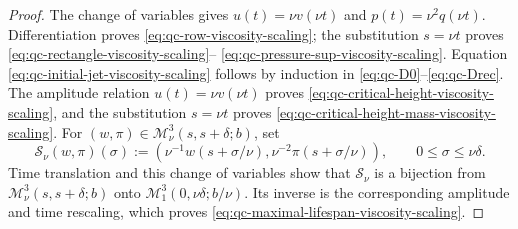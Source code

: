 \begin{proof}
The change of variables gives
\(u(t)=\nu v(\nu t)\) and \(p(t)=\nu^2q(\nu t)\).
Differentiation proves \eqref{eq:qc-row-viscosity-scaling}; the substitution
\(s=\nu t\) proves
\eqref{eq:qc-rectangle-viscosity-scaling}--%
\eqref{eq:qc-pressure-sup-viscosity-scaling}.
Equation \eqref{eq:qc-initial-jet-viscosity-scaling} follows by induction in
\eqref{eq:qc-D0}--\eqref{eq:qc-Drec}.  The amplitude relation
\(u(t)=\nu v(\nu t)\) proves
\eqref{eq:qc-critical-height-viscosity-scaling}, and the substitution
\(s=\nu t\) proves
\eqref{eq:qc-critical-height-mass-viscosity-scaling}.  For
\((w,\pi)\in\mathscr M_\nu^3(s,s+\delta;b)\), set
\[
 \mathcal S_\nu(w,\pi)(\sigma)
 :=
 \left(
  \nu^{-1}w(s+\sigma/\nu),
  \nu^{-2}\pi(s+\sigma/\nu)
 \right),
 \qquad 0\le\sigma\le\nu\delta.
\]
Time translation and this change of variables show that
\(\mathcal S_\nu\) is a bijection from
\(\mathscr M_\nu^3(s,s+\delta;b)\) onto
\(\mathscr M_1^3(0,\nu\delta;b/\nu)\).
Its inverse is the corresponding amplitude and time rescaling,
which proves \eqref{eq:qc-maximal-lifespan-viscosity-scaling}.
\end{proof}


